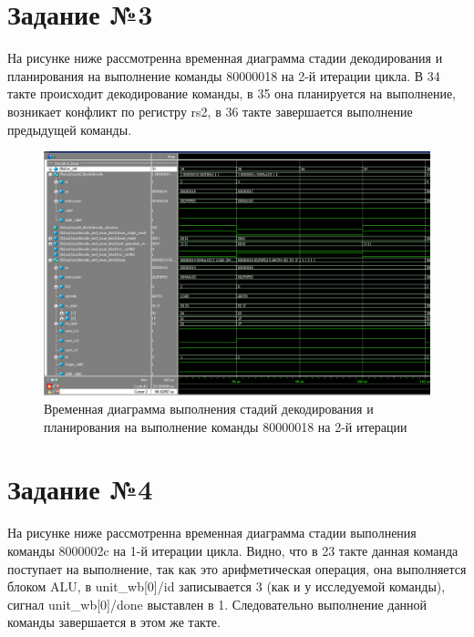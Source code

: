 \chapter{Задание №3}

На рисунке ниже рассмотренна временная диаграмма стадии декодирования и планирования на выполнение команды 80000018 на 2-й итерации цикла. В 34 такте происходит декодирование команды, в 35 она планируется на выполнение, возникает конфликт по регистру rs2, в 36 такте завершается выполнение предыдущей команды.

\begin{figure}[h!]
	\begin{center}
		\includegraphics[scale=0.6]{assets/Task3.png}
	\end{center}
	\caption{Временная диаграмма выполнения стадий декодирования и планирования на выполнение команды 80000018 на 2-й итерации}
\end{figure}

\chapter{Задание №4}

На рисунке ниже рассмотренна временная диаграмма стадии выполнения команды 8000002c на 1-й итерации цикла. Видно, что в 23 такте данная команда поступает на выполнение, так как это арифметическая операция, она выполняется блоком ALU, в unit\_wb[0]/id записывается 3 (как и у исследуемой команды), сигнал unit\_wb[0]/done выставлен в 1. Следовательно выполнение данной команды завершается в этом же такте.


